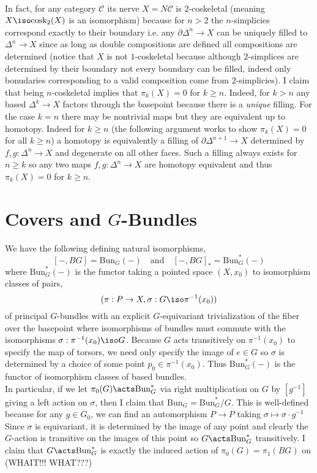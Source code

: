 \documentclass[12pt]{extarticle}
\newcommand{\Bun}{\mathrm{Bun}}
\begin{document}
\bigskip\\
In fact, for any category $\mathcal{C}$ its nerve $X = N \mathcal{C}$ is $2$-coskeletal (meaning $X \iso \mathrm{cosk}_2(X)$ is an isomorphism) because for $n > 2$ the $n$-simplicies correspond exactly to their boundary i.e. any $\partial \Delta^n \to X$ can be uniquely filled to $\Delta^n \to X$ since as long as double compositions are defined all compositions are determined (notice that $X$ is not $1$-coskeletal because although $2$-simplices are determined by their boundary not every boundary can be filled, indeed only bonudaries corresponding to a valid composition come from $2$-simplicies). I claim that being $n$-coskeletal implies that $\pi_k(X) = 0$ for $k \ge n$. Indeed, for $k > n$ any based $\Delta^k \to X$ factors through the basepoint because there is a \textit{unique} filling. For the case $k = n$ there may be nontrivial maps but they are equivalent up to homotopy. Indeed for $k \ge n$ (the following argument works to show $\pi_k(X) = 0$ for all $k \ge n$) a homotopy is equivalently a filling of $\partial \Delta^{n+1} \to X$ 
determined by $f,g : \Delta^n \to X$ and degenerate on all other faces. Such a filling always exists for $n \ge k$ so any two maps $f,g : \Delta^n \to X$ are homotopy equivalent and thus $\pi_k(X) = 0$ for $k \ge n$. 

\section{Covers and $G$-Bundles}

We have the following defining natural isomorphisms,
\[ [-, BG] = \Bun_G(-) \quad \text{and} \quad [-, BG]_* = \Bun^*_G(-) \]
where $\Bun^*_G(-)$ is the functor taking a pointed space $(X, x_0)$ to isomorphism classes of pairs,
\[ (\pi : P \to X, \sigma : G \iso \pi^{-1}(x_0)) \]
of principal $G$-bundles with an explicit $G$-equivariant trivialization of the fiber over the basepoint where isomorphisms of bundles must commute with the isomorphisms $\sigma : \pi^{-1}(x_0) \iso G$. Because $G$ acts transitively on $\pi^{-1}(x_0)$ to specify the map of torsors, we need only specify the image of $e \in G$ so $\sigma$ is determined by a choice of some point $p_0 \in \pi^{-1}(x_0)$. Thus $\Bun^*_G(-)$ is the functor of isomorphism classes of based bundles. 
\bigskip\\
In particular, if we let $\pi_0(G) \acts \Bun^*_G$ via right multiplication on $G$ by $[g^{-1}]$ giving a left action on $\sigma$, then I claim that $\Bun_G = \Bun_G^* / G$. This is well-defined because for any $g \in G_0$, we can find an automorphism $P \to P$ taking $\sigma \mapsto \sigma \cdot g^{-1}$
\bigskip\\
Since $\sigma$ is equivariant, it is determined by the image of any point and clearly the $G$-action is transitive on the images of this point so $G \acts \Bun_G^*$ transitively. I claim that $G \acts \Bun_G^*$ is exactly the induced action of $\pi_0(G) = \pi_1(BG)$ on 
(WHAIT!!! WHAT???)
\end{document}
